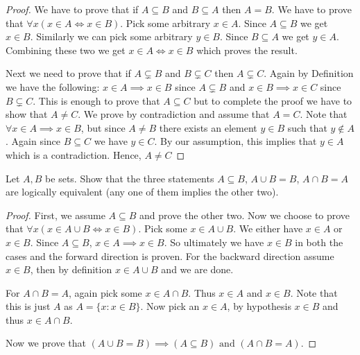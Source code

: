 \documentclass[12pt]{article}
\theoremstyle{remark}
\newcommand{\exercise}[1]{\noindent {\bf Exercise #1.}}
\newenvironment{ques}[1][]{%
	\begin{mdframed}[style=mdblackbox]
		\exercise{#1}
}{%
\end{mdframed}
}
\begin{document}
\begin{proof}
    We have to prove that if $ A \subseteq B $ and $ B \subseteq A $ then $ A = B $. We have to prove that $ \forall x (x \in A \iff x \in B ) $. Pick some arbitrary $ x \in A $. Since $ A \subseteq B $ we get $ x \in B $. Similarly we can pick some arbitrary $ y \in B $. Since $ B \subseteq A $ we get $ y \in A $. Combining these two we get $ x \in A \iff x \in B $ which proves the result.\par
    Next we need to prove that if $ A \subsetneq B $ and $ B \subsetneq C $ then $ A \subsetneq C $. Again by Definition we have the following: $ x \in A \implies x \in B $ since $ A \subsetneq B $ and $ x \in B \implies x \in C $ since $ B \subsetneq C $. This is enough to prove that $ A \subseteq C $ but to complete the proof we have to show that $ A \neq C $. 
    We prove by contradiction and assume that $ A = C $. Note that $ \forall x \in A \implies x \in B $, but since $ A \neq B $ there exists an element $ y \in B $ such that $ y \notin A $. Again since $ B \subseteq C $ we have $ y \in C $. By our assumption, this implies that $ y \in A $ which is a contradiction. Hence, $ A \neq C $
\end{proof}

\begin{ques}[3.1.5]
    Let $ A, B $ be sets. Show that the three statements $ A \subseteq B $, $ A \cup B = B $, $ A \cap B = A $ are logically equivalent (any one of them implies the other two).
\end{ques}

\begin{proof}
   First, we assume $ A \subseteq B $ and prove the other two. Now we choose to prove that $ \forall x (x \in A \cup B \iff x \in B) $. Pick some $ x \in A \cup B $. We either have $ x \in A $ or $ x \in B $. Since $ A \subseteq B $, $ x \in A \implies x \in B $. So ultimately we have $ x \in B $ in both the cases and the forward direction is proven. For the backward direction assume $ x \in B $, then by definition $ x \in A \cup B $ and we are done. \par
   For $ A \cap B = A $, again pick some $ x \in A \cap B $. Thus $ x \in A $ and $ x \in B $. Note that this is just $ A $ as $ A = \{ x : x \in B \} $. Now pick an $ x \in A $, by hypothesis $ x \in B $ and thus $ x \in A \cap B $. \par 
   Now we prove that $ (A \cup B = B) \implies (A \subseteq B) \text{ and } (A \cap B = A) $.   
\end{proof}
\end{document}

